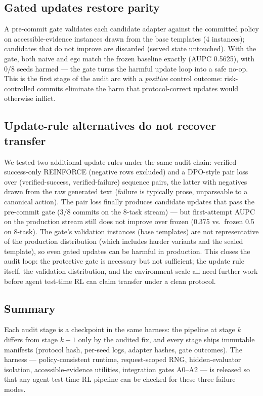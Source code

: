 \subsection{Gated updates restore parity}
A pre-commit gate validates each candidate adapter against the
committed policy on accessible-evidence instances drawn from the base
templates (4 instances); candidates that do not improve are discarded
(served state untouched). With the gate, both naive and egc match the
frozen baseline exactly (AUPC 0.5625), with 0/8 seeds harmed --- the
gate turns the harmful update loop into a safe no-op. This is the
first stage of the audit arc with a \emph{positive} control outcome:
risk-controlled commits eliminate the harm that protocol-correct
updates would otherwise inflict.

\subsection{Update-rule alternatives do not recover transfer}
We tested two additional update rules under the same audit chain:
verified-success-only REINFORCE (negative rows excluded) and a DPO-style
pair loss over (verified-success, verified-failure) sequence pairs, the
latter with negatives drawn from the raw generated text (failure is
typically prose, unparseable to a canonical action). The pair loss
finally produces candidate updates that pass the pre-commit gate (3/8
commits on the 8-task stream) --- but first-attempt AUPC on the
production stream still does not improve over frozen (0.375 vs.\ frozen
0.5 on 8-task). The gate's validation instances (base templates) are
not representative of the production distribution (which includes
harder variants and the sealed template), so even gated updates can be
harmful in production. This closes the audit loop: the protective gate
is necessary but not sufficient; the update rule itself, the
validation distribution, and the environment scale all need further
work before agent test-time RL can claim transfer under a clean
protocol.

\subsection{Summary}
Each audit stage is a checkpoint in the same harness: the pipeline at
stage $k$ differs from stage $k-1$ only by the audited fix, and every
stage ships immutable manifests (protocol hash, per-seed logs, adapter
hashes, gate outcomes). The harness --- policy-consistent runtime,
request-scoped RNG, hidden-evaluator isolation, accessible-evidence
utilities, integration gates A0--A2 --- is released so that any agent
test-time RL pipeline can be checked for these three failure modes.
